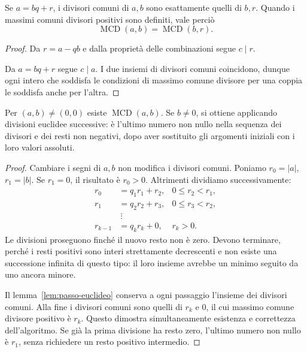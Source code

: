 \begin{lemma}\label{lem:passo-euclideo}
Se $a=bq+r$, i divisori comuni di $a,b$ sono esattamente quelli di $b,r$. Quando i massimi comuni divisori positivi sono definiti, vale perciò
\[
\operatorname{MCD}(a,b)=\operatorname{MCD}(b,r).
\]
\end{lemma}
\begin{proof}
 Da $r=a-qb$ e dalla proprietà delle combinazioni segue $c\mid r$.

 Da $a=bq+r$ segue $c\mid a$. I due insiemi di divisori comuni coincidono, dunque ogni intero che soddisfa le condizioni di massimo comune divisore per una coppia le soddisfa anche per l'altra.
\end{proof}

\begin{teorema}\label{teo:euclide}
Per $(a,b)\ne(0,0)$ esiste $\operatorname{MCD}(a,b)$. Se $b\ne0$, si ottiene applicando divisioni euclidee successive: è l'ultimo numero non nullo nella sequenza dei divisori e dei resti non negativi, dopo aver sostituito gli argomenti iniziali con i loro valori assoluti.
\end{teorema}
\begin{proof}
Cambiare i segni di $a,b$ non modifica i divisori comuni. Poniamo $r_0=|a|$, $r_1=|b|$. Se $r_1=0$, il risultato è $r_0>0$. Altrimenti dividiamo successivamente:
\[
\begin{aligned}
r_0&=q_1r_1+r_2,&0\le r_2<r_1,\\
r_1&=q_2r_2+r_3,&0\le r_3<r_2,\\
&\ \vdots\\
r_{k-1}&=q_kr_k+0,&r_k>0.
\end{aligned}
\]
Le divisioni proseguono finché il nuovo resto non è zero. Devono terminare, perché i resti positivi sono interi strettamente decrescenti e non esiste una successione infinita di questo tipo: il loro insieme avrebbe un minimo seguito da uno ancora minore.

Il lemma~\ref{lem:passo-euclideo} conserva a ogni passaggio l'insieme dei divisori comuni. Alla fine i divisori comuni sono quelli di $r_k$ e $0$, il cui massimo comune divisore positivo è $r_k$. Questo dimostra simultaneamente esistenza e correttezza dell'algoritmo. Se già la prima divisione ha resto zero, l'ultimo numero non nullo è $r_1$, senza richiedere un resto positivo intermedio.
\end{proof}


